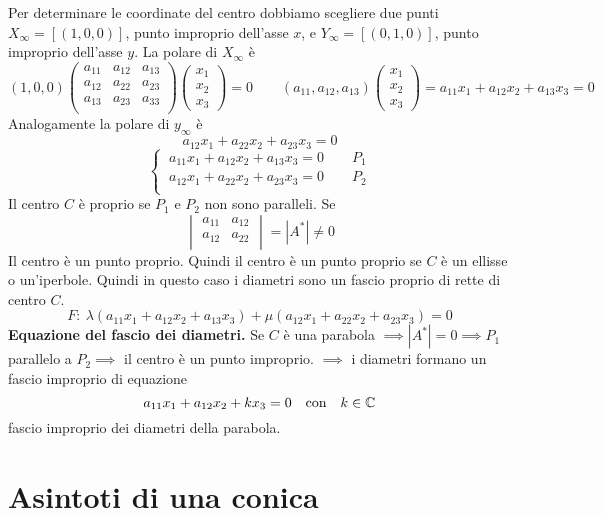 \documentclass{report}
\begin{document}
Per determinare le coordinate del centro dobbiamo scegliere due punti \(X_{\infty} = [(1, 0, 0)]\), punto improprio dell'asse \(x\), e \(Y_{\infty} = [(0,1,0)]\), punto improprio dell'asse \(y\). La polare di \(X_{\infty}\) è \[
    (1,0,0)
\begin{pmatrix}
    a_{11} & a_{12} & a_{13} \\
    a_{12} & a_{22} & a_{23} \\
    a_{13} & a_{23} & a_{33} \\
\end{pmatrix}
\begin{pmatrix} x_1 \\ x_2\\ x_3 \end{pmatrix} = 0 \qquad (a_{11}, a_{12}, a_{13}) \begin{pmatrix} x_1 \\ x_2\\ x_3 \end{pmatrix} = a_{11}x_1+a_{12}x_2 + a_{13} x_3 = 0
\] Analogamente la polare di \(y_{\infty}\) è  \[
a_{12}x_1 + a_{22}x_2 + a_{23}x_3 = 0
\] \[
\begin{cases}
    \ a_{11}x_1+a_{12}x_2+a_{13}x_3 = 0 \qquad P_1 \\
    \ a_{12}x_1+a_{22}x_2+a_{23}x_3=0 \qquad P_2 \\
\end{cases}
\] 
Il centro \(C\) è proprio se \(P_1\) e \(P_2\) non sono paralleli. Se \[
\begin{vmatrix}
    a_{11} & a_{12} \\
    a_{12} & a_{22} \\
\end{vmatrix} = |A^{*}| \neq 0
\] Il centro è un punto proprio. Quindi il centro è un punto proprio se \(C\) è un ellisse o un'iperbole. Quindi in questo caso i diametri sono un fascio proprio di rette di centro \(C\). \[
F: \ \lambda (a_{11}x_1+a_{12}x_2+a_{13}x_3) + \mu (a_{12}x_1 + a_{22}x_2 + a_{23}x_3) = 0
\] \textbf{Equazione del fascio dei diametri.} Se \(C\) è una parabola \(\implies |A^{*}| = 0 \implies P_1 \) parallelo a \(P_2 \implies  \) il centro è un punto improprio. \(\implies \) i diametri formano un fascio improprio di equazione \[
a_{11}x_1+a_{12}x_2 + kx_3 = 0 \quad \text{con} \quad k \in \CC
\] fascio improprio dei diametri della parabola.

\section{Asintoti di una conica}
\end{document}
